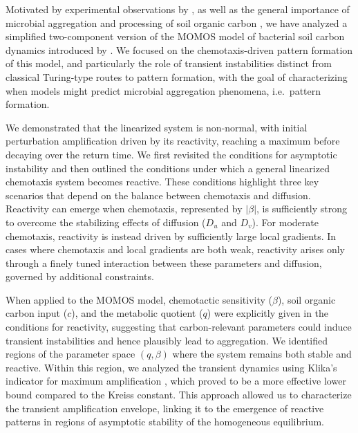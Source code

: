 \documentclass{article}
\begin{document}
{Motivated by experimental observations by \cite{vogel2014submicron}, {as well as the general importance of microbial aggregation and processing of soil organic carbon \cite{zhang2023soil}}, we have analyzed a simplified two-component version of the MOMOS model of bacterial soil carbon dynamics introduced by \cite{hammoudi2018mathematical}. We focused on the chemotaxis-driven pattern formation of this model, and particularly the role of transient instabilities distinct from classical Turing-type routes to pattern formation, {with the goal of characterizing when models might predict microbial aggregation phenomena, i.e.~pattern formation}. 

We demonstrated that the linearized system is non-normal, with initial perturbation amplification driven by its reactivity, reaching a maximum before decaying over the return time. We first revisited the conditions for asymptotic instability and then outlined the conditions under which a general linearized chemotaxis system becomes reactive. These conditions highlight three key scenarios that depend on the balance between chemotaxis and diffusion. Reactivity can emerge when chemotaxis, represented by $|\beta|$, is sufficiently strong to overcome the stabilizing effects of diffusion ($D_u$ and $D_v$). For moderate chemotaxis, reactivity is instead driven by sufficiently large local gradients. In cases where chemotaxis and local gradients are both weak, reactivity arises only through a finely tuned interaction between these parameters and diffusion, governed by additional constraints.


When applied to the MOMOS model, {chemotactic sensitivity ($\beta$), soil organic carbon input ($c$), and the metabolic quotient ($q$) were explicitly given in the conditions for reactivity, suggesting that carbon-relevant parameters could induce transient instabilities and hence plausibly lead to aggregation}. We identified regions of the parameter space $(q, \beta)$ where the system remains both stable and reactive. Within this region, we analyzed the transient dynamics using Klika's indicator for maximum amplification \cite{klika2017significance}, which proved to be a more effective lower bound compared to the Kreiss constant. This approach allowed us to characterize the transient amplification envelope, linking it to the emergence of reactive patterns in regions of asymptotic stability of the homogeneous equilibrium.

}
\end{document}
